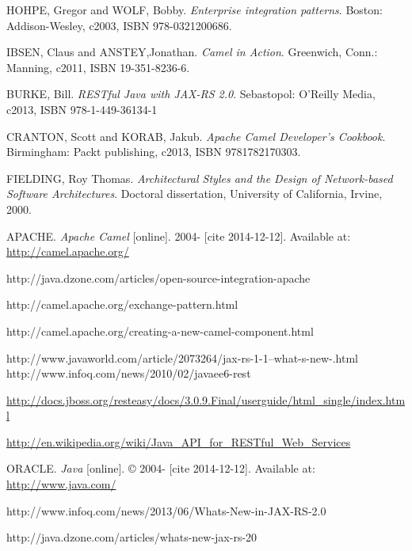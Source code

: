 \documentclass[12pt,final,oneside]{fithesis2}
\begin{document}



\begin{thebibliography}{}


 HOHPE, Gregor and WOLF, Bobby. \textit{Enterprise integration patterns}. Boston: Addison-Wesley, c2003, ISBN 978-0321200686.

 IBSEN, Claus and ANSTEY,Jonathan. \textit{Camel in Action}. Greenwich, Conn.: Manning, c2011, ISBN 19-351-8236-6.

 BURKE, Bill. \textit{RESTful Java with JAX-RS 2.0}. Sebastopol: O'Reilly Media, c2013, ISBN 978-1-449-36134-1

 CRANTON, Scott and KORAB, Jakub. \textit{Apache Camel Developer's Cookbook}.  Birmingham: Packt publishing, c2013, ISBN 9781782170303.

 FIELDING, Roy Thomas. \textit{Architectural Styles and the Design of Network-based Software Architectures}. Doctoral dissertation, University of California, Irvine, 2000. 

 APACHE. \textit{Apache Camel} [online]. 2004- [cite 2014-12-12]. Available at: \url{http://camel.apache.org/}

 http://java.dzone.com/articles/open-source-integration-apache

 http://camel.apache.org/exchange-pattern.html

 http://camel.apache.org/creating-a-new-camel-component.html




 http://www.javaworld.com/article/2073264/jax-rs-1-1--what-s-new-.html
 http://www.infoq.com/news/2010/02/javaee6-rest

\url{http://docs.jboss.org/resteasy/docs/3.0.9.Final/userguide/html_single/index.html}

 \url{http://en.wikipedia.org/wiki/Java_API_for_RESTful_Web_Services}



 ORACLE. \textit{Java} [online]. \copyright{} 2004- [cite 2014-12-12]. Available at: \url{http://www.java.com/}		

 http://www.infoq.com/news/2013/06/Whats-New-in-JAX-RS-2.0

 http://java.dzone.com/articles/whats-new-jax-rs-20 	


\end{thebibliography}
\end{document}
